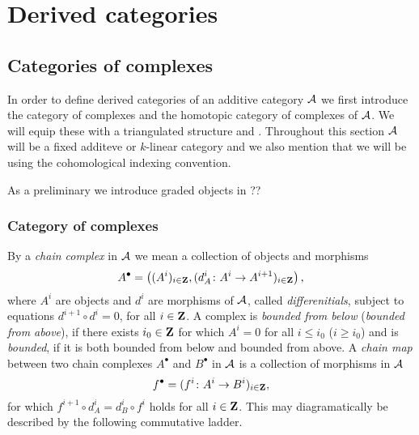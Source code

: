 \section{Derived categories}

\subsection{Categories of complexes}
In order to define derived categories of an additive category $\mathcal A$ we first introduce the category of complexes and the homotopic category of complexes of $\mathcal A$. We will equip these with a triangulated structure and . Throughout this section $\mathcal A$ will be a fixed additeve or $k$-linear category and we also mention that we will be using the cohomological indexing convention.

As a preliminary we introduce graded objects in ??

\subsubsection*{{Category of complexes}}

By a \emph{chain complex} in $\mathcal A$ we mean a collection of objects and morphisms 
\[
    A^\bullet = \left((A^i)_{i \in \mathbf Z}, (d^i_A\colon A^i \to A^{i+1})_{i \in \mathbf Z}\right),
\] 
where $A^i$ are objects and $d^i$ are morphisms of $\mathcal A$, called \emph{differenitials}, subject to equations $d^{i+1}\circ d^i = 0$, for all $i \in \mathbf Z$. A complex is \emph{bounded from below} (\resp \emph{bounded from above}), if there exists $i_0 \in \mathbf Z$ for which $A^i = 0$ for all $i \leq i_0$ (\resp $i \geq i_0$) and is \emph{bounded}, if it is both bounded from below and bounded from above. A \emph{chain map} between two chain complexes $A^\bullet$ and $B^\bullet$ in $\mathcal A$ is a collection of morphisms in $\mathcal A$
\[
    f^\bullet = (f^i\colon A^i \to B^i)_{i \in \mathbf Z},
\]
for which $f^{i+1}\circ d^i_A = d^i_B \circ f^i$ holds for all $i \in \mathbf Z$. This may diagramatically be described by the following commutative ladder.


